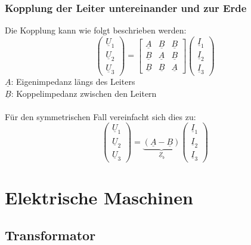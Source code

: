 \documentclass[a4paper,twocolumn,10pt]{article}
\begin{document}
\subsubsection{Kopplung der Leiter untereinander und zur Erde}
Die Kopplung kann wie folgt beschrieben werden:
\begin{equation*}
\begin{pmatrix}\underline{U}_1 \\ \underline{U}_2 \\ \underline{U}_3\end{pmatrix}=\begin{bmatrix}\underline{A} & \underline{B} & \underline{B} \\ \underline{B} & \underline{A} & \underline{B} \\ \underline{B} & \underline{B} & \underline{A}\end{bmatrix}\begin{pmatrix}\underline{I}_1 \\ \underline{I}_2 \\ \underline{I}_3\end{pmatrix}
\end{equation*}
$\underline{A}$: Eigenimpedanz längs des Leiters\\
$\underline{B}$: Koppelimpedanz zwischen den Leitern\\\\
Für den symmetrischen Fall vereinfacht sich dies zu:
\begin{equation*}
\begin{pmatrix}\underline{U}_1 \\ \underline{U}_2 \\ \underline{U}_3\end{pmatrix}=\underbrace{(\underline{A}-\underline{B})}_{\underline{Z}_b}\begin{pmatrix}\underline{I}_1 \\ \underline{I}_2 \\ \underline{I}_3\end{pmatrix}
\end{equation*}

\section{Elektrische Maschinen}

\subsection{Transformator}
\end{document}
